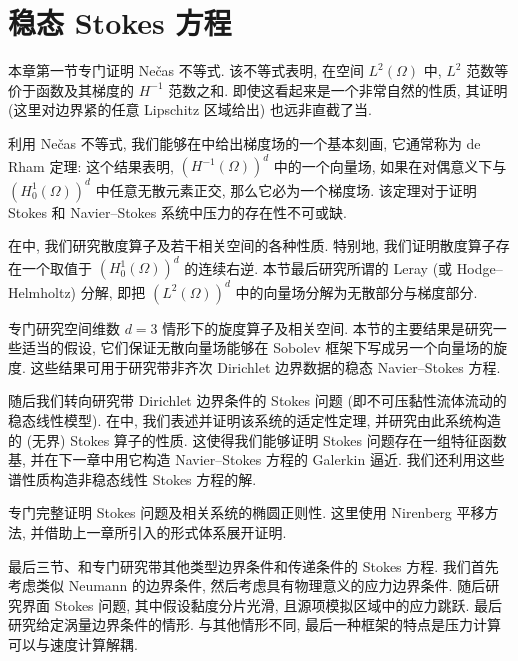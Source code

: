 \clearpage
\section{稳态 Stokes 方程}
\label{chap:steady-stokes-equations}
\renewcommand{\thestatement}{1.\arabic{statement}}
\setcounter{statement}{0}
\renewcommand{\thechapterfoursectiononeremark}{1.\arabic{chapterfoursectiononeremark}}

本章第一节专门证明 Nečas 不等式. 该不等式表明, 在空间 $L^2(\Omega)$ 中, $L^2$ 范数等价于函数及其梯度的 $H^{-1}$ 范数之和. 即使这看起来是一个非常自然的性质, 其证明 (这里对边界紧的任意 Lipschitz 区域给出) 也远非直截了当.

利用 Nečas 不等式, 我们能够在中给出梯度场的一个基本刻画, 它通常称为 de Rham 定理: 这个结果表明, $(H^{-1}(\Omega))^d$ 中的一个向量场, 如果在对偶意义下与 $(H_0^1(\Omega))^d$ 中任意无散元素正交, 那么它必为一个梯度场. 该定理对于证明 Stokes 和 Navier--Stokes 系统中压力的存在性不可或缺.

在中, 我们研究散度算子及若干相关空间的各种性质. 特别地, 我们证明散度算子存在一个取值于 $(H_0^1(\Omega))^d$ 的连续右逆. 本节最后研究所谓的 Leray (或 Hodge--Helmholtz) 分解, 即把 $(L^2(\Omega))^d$ 中的向量场分解为无散部分与梯度部分.

专门研究空间维数 $d=3$ 情形下的旋度算子及相关空间. 本节的主要结果是研究一些适当的假设, 它们保证无散向量场能够在 Sobolev 框架下写成另一个向量场的旋度. 这些结果可用于研究带非齐次 Dirichlet 边界数据的稳态 Navier--Stokes 方程.

随后我们转向研究带 Dirichlet 边界条件的 Stokes 问题 (即不可压黏性流体流动的稳态线性模型). 在中, 我们表述并证明该系统的适定性定理, 并研究由此系统构造的 (无界) Stokes 算子的性质. 这使得我们能够证明 Stokes 问题存在一组特征函数基, 并在下一章中用它构造 Navier--Stokes 方程的 Galerkin 逼近. 我们还利用这些谱性质构造非稳态线性 Stokes 方程的解.

专门完整证明 Stokes 问题及相关系统的椭圆正则性. 这里使用 Nirenberg 平移方法, 并借助上一章所引入的形式体系展开证明.

最后三节、和专门研究带其他类型边界条件和传递条件的 Stokes 方程. 我们首先考虑类似 Neumann 的边界条件, 然后考虑具有物理意义的应力边界条件. 随后研究界面 Stokes 问题, 其中假设黏度分片光滑, 且源项模拟区域中的应力跳跃. 最后研究给定涡量边界条件的情形. 与其他情形不同, 最后一种框架的特点是压力计算可以与速度计算解耦.

